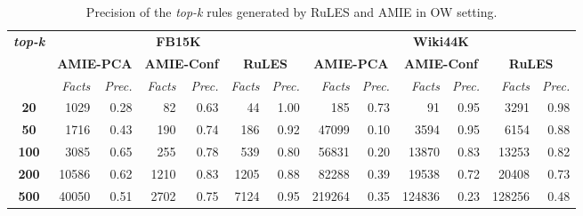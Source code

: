 \setlength\tabcolsep{0.2em}
\begin{table}[t]
\scriptsize
\centering
\begin{tabular}{c|r r|r r|r r|r r|r r|r r}

 \multirow{3}{*}{\textbf{\textit{top-k}}}&\multicolumn{6}{|c}{\textbf{FB15K}} & \multicolumn{6}{|c}{\textbf{Wiki44K}}\\
 \cmidrule{2-13}&\multicolumn{2}{|c}{\textbf{AMIE-PCA}}&\multicolumn{2}{|c|}{\textbf{AMIE-Conf}}&\multicolumn{2}{|c}{\textbf{RuLES}}&\multicolumn{2}{|c}{\textbf{AMIE-PCA}}&\multicolumn{2}{|c}{\textbf{AMIE-Conf}}&\multicolumn{2}{|c}{\textbf{RuLES}} \\
 & \textit{Facts} & \textit{Prec.} & \textit{Facts} & \textit{Prec.} & \textit{Facts} & \textit{Prec.} &\textit{Facts} & \textit{Prec.} &\textit{Facts} & \textit{Prec.} &\textit{Facts} & \textit{Prec.} \\
 \midrule
 \textbf{20} & 1029 & 0.28 & 82 & 0.63 & 44 & 1.00 & 185 & 0.73 & 91 & 0.95 & 3291 & 0.98\\
 \textbf{50} & 1716 & 0.43 & 190 & 0.74 & 186 & 0.92 & 47099 & 0.10 & 3594 & 0.95 & 6154 & 0.88 \\
\textbf{100} & 3085 & 0.65 & 255 & 0.78 & 539 & 0.80 & 56831 & 0.20 & 13870 & 0.83 & 13253 & 0.82 \\
\textbf{200} & 10586 & 0.62 & 1210 & 0.83 & 1205 & 0.88 & 82288 & 0.39 & 19538 & 0.72 & 20408 & 0.73 \\
\textbf{500} & 40050 & 0.51 & 2702 & 0.75 & 7124 & 0.95 & 219264 & 0.35 & 124836 & 0.23 & 128256 & 0.48 \\
 \bottomrule
\end{tabular}
\caption*{Precision of the \textit{top-k} rules generated by RuLES and AMIE in OW setting.}
\label{table:amie_vs_RuLES}
\vspace*{-3mm}
\end{table}

